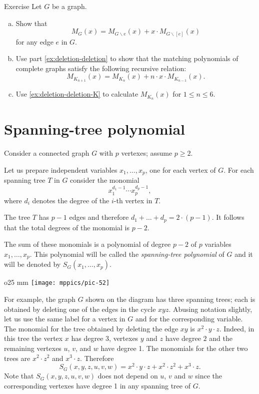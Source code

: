 \begin{thm}{Exercise}\label{ex:deletion-deletion-total}
Let $G$ be a graph.
\begin{enumerate}[(a)]
\item\label{ex:deletion-deletion} Show that
\[M_G(x)=M_{G\backslash e}(x)+x\cdot M_{G\backslash [e]}(x)\]
for any edge $e$ in $G$.

\item\label{ex:deletion-deletion-K} Use part \ref{ex:deletion-deletion} to show that the matching polynomials of complete graphs satisfy the following recursive relation:
\[M_{K_{n+1}}(x)=M_{K_{n}}(x)+n\cdot x\cdot M_{K_{n-1}}(x).\]

\item Use \ref{ex:deletion-deletion-K} to calculate $M_{K_n}(x)$ for $1\le n\le 6$.
\end{enumerate}

\end{thm}

\section*{Spanning-tree polynomial}

Consider a connected graph $G$ with $p$ vertexes;
assume $p\ge 2$.

Let us prepare independent variables $x_1,\dots,x_p$, one for each vertex of $G$.
For each spanning tree $T$ in $G$ consider the monomial 
\[x_1^{d_1-1}\cdots x_p^{d_p-1},\]
where $d_i$ denotes the degree of the $i$-th vertex in $T$.

The tree $T$ has $p-1$ edges and therefore 
$d_1+\dots+d_p=2\cdot(p-1)$.
It follows that the total degrees of the monomial is $p-2$.

The sum of these monomials is a polynomial of degree $p-2$ of $p$ variables $x_1,\dots, x_p$.
This polynomial will be called the \emph{spanning-tree polynomial} of $G$ and it will be denoted by 
$S_G(x_1,\dots,x_p)$.

\begin{wrapfigure}{o}{25 mm}
\vskip-0mm
\centering
\texttt{[image: mppics/pic-52]}
\vskip-0mm
\end{wrapfigure}

For example, the graph $G$ shown on the diagram has three spanning trees; each is obtained by deleting one of the edges in the cycle $xyz$.
Abusing notation slightly, let us use the same label for a vertex in $G$ and for the corresponding variable.
The monomial for the tree obtained by deleting the edge $xy$ is $x^2\cdot y\cdot z$.
Indeed, in this tree the vertex $x$ has degree 3, vertexes $y$ and $z$ have degree $2$ and the remaining vertexes $u$, $v$, and $w$ have degree 1.
The monomials for the other two trees are $x^2\cdot z^2$ and $x^3\cdot z$.
Therefore 
\[S_G(x,y,z,u,v,w)= x^2\cdot y\cdot z+x^2\cdot z^2+x^3\cdot z.\]
Note that $S_G(x,y,z,u,v,w)$ does not depend on $u$, $v$ and $w$ since the corresponding vertexes have degree 1 in any spanning tree of $G$.


